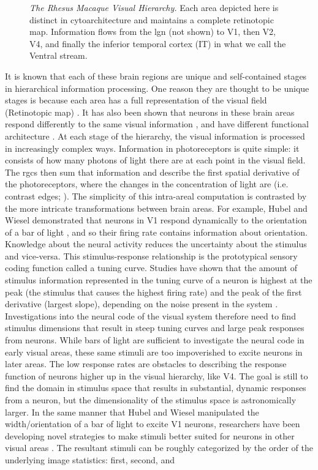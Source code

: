 \begin{figure}[h]
	\caption{\textit{The Rhesus Macaque Visual Hierarchy.} Each area depicted here is distinct in cytoarchitecture and maintains a complete retinotopic map. Information flows from the \gls{lgn} (not shown) to V1, then V2, V4, and finally the inferior temporal cortex (IT) in what we call the Ventral stream. }
	\label{fig:brain}
\end{figure}

It is known that each of these brain regions are unique and self-contained stages in hierarchical information processing. One reason they are thought to be unique stages is because each area has a full representation of the visual field (Retinotopic map) \citep{Felleman1997}. It has also been shown that neurons in these brain areas respond differently to the same visual information \citep{Mahon2001}, and have different functional architecture \citep{Yoshioka1996, Hubel1965}. At each stage of the hierarchy, the visual information is processed in increasingly complex ways. Information in photoreceptors is quite simple: it consists of how many photons of light there are at each point in the visual field. The \gls{rgcs} then sum that information and describe the first spatial derivative of the photoreceptors, where the changes in the concentration of light are (i.e. contrast edges; \cite{Wiesel1959}). The simplicity of this intra-areal computation is contrasted by the more intricate transformations between brain areas. For example, Hubel and Wiesel demonstrated that neurons in V1 respond dynamically to the orientation of a bar of light \citep{Hubel1959}, and so their firing rate contains information about orientation. Knowledge about the neural activity reduces the uncertainty about the stimulus and vice-versa. This stimulus-response relationship is the prototypical sensory coding function called a tuning curve. Studies have shown that the amount of stimulus information represented in the tuning curve of a neuron is highest at the peak (the stimulus that causes the highest firing rate) and the peak of the first derivative (largest slope), depending on the noise present in the system \cite{Butts2006}. Investigations into the neural code of the visual system therefore need to find stimulus dimensions that result in steep tuning curves and large peak responses from neurons. While bars of light are sufficient to investigate the neural code in early visual areas, these same stimuli are too impoverished to excite neurons in later areas. The low response rates are obstacles to describing the response function of neurons higher up in the visual hierarchy, like V4. The goal is still to find the domain in stimulus space that results in substantial, dynamic responses from a neuron, but the dimensionality of the stimulus space is astronomically larger. In the same manner that Hubel and Wiesel manipulated the width/orientation of a bar of light to excite V1 neurons, researchers have been developing novel strategies to make stimuli better suited for neurons in other visual areas \cite{Hubel1959, Pasupathy2002, Ponce2019, Cowley2017}. The resultant stimuli can be roughly categorized by the order of the underlying image statistics: first, second, and 